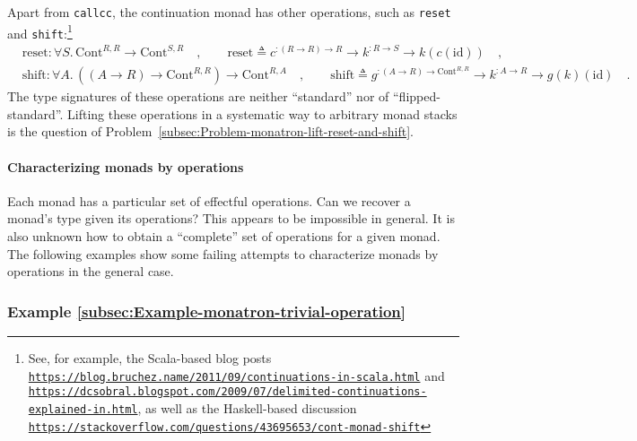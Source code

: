 Apart from \lstinline!callcc!, the continuation monad has other operations,
such as \lstinline!reset! and \lstinline!shift!:\footnote{See, for example, the Scala-based blog posts \texttt{\href{https://blog.bruchez.name/2011/09/continuations-in-scala.html}{https://blog.bruchez.name/2011/09/continuations-in-scala.html}}
and \texttt{\href{https://dcsobral.blogspot.com/2009/07/delimited-continuations-explained-in.html}{https://dcsobral.blogspot.com/2009/07/delimited-continuations-explained-in.html}},
as well as the Haskell-based discussion \texttt{\href{https://stackoverflow.com/questions/43695653/cont-monad-shift}{https://stackoverflow.com/questions/43695653/cont-monad-shift}}}
\begin{align*}
 & \text{reset}:\forall S.\,\text{Cont}^{R,R}\rightarrow\text{Cont}^{S,R}\quad,\quad\quad\text{reset}\triangleq c^{:\left(R\rightarrow R\right)\rightarrow R}\rightarrow k^{:R\rightarrow S}\rightarrow k(c(\text{id}))\quad,\\
 & \text{shift}:\forall A.\,((A\rightarrow R)\rightarrow\text{Cont}^{R,R})\rightarrow\text{Cont}^{R,A}\quad,\quad\quad\text{shift}\triangleq g^{:\left(A\rightarrow R\right)\rightarrow\text{Cont}^{R,R}}\rightarrow k^{:A\rightarrow R}\rightarrow g(k)(\text{id})\quad.
\end{align*}
The type signatures of these operations are neither \textsf{``}standard\textsf{''}
nor of \textsf{``}flipped-standard\textsf{''}. Lifting these operations in a systematic
way to arbitrary monad stacks is the question of Problem~\ref{subsec:Problem-monatron-lift-reset-and-shift}.

\paragraph{Characterizing monads by operations}

Each monad has a particular set of effectful operations. Can we recover
a monad\textsf{'}s type given its operations? This appears to be impossible
in general. It is also unknown how to obtain a \textsf{``}complete\textsf{''} set
of operations for a given monad. The following examples show some
failing attempts to characterize monads by operations in the general
case.

\subsubsection{Example \label{subsec:Example-monatron-trivial-operation}\ref{subsec:Example-monatron-trivial-operation}}


